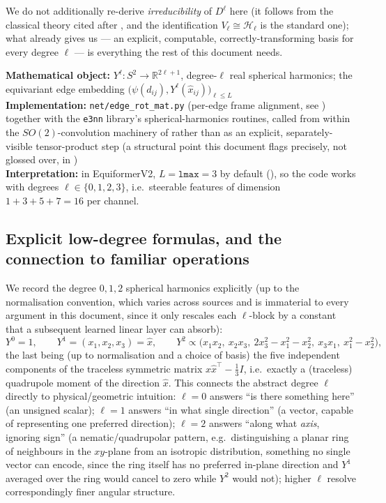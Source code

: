 \documentclass[11pt,a4paper]{report}
\theoremstyle{definition}
\theoremstyle{remark}
\newcommand{\RR}{\mathbb R}
\newcommand{\file}[1]{\texttt{#1}}
\begin{document}
We do not additionally re-derive \emph{irreducibility} of $D^\ell$ here (it
follows from the classical theory cited after
, and the identification
$V_\ell\cong\mathcal H_\ell$ is the standard one); what 
already gives us --- an explicit, computable, correctly-transforming basis
for every degree $\ell$ --- is everything the rest of this document needs.

\begin{codebox}
\textbf{Mathematical object:} $Y^\ell:S^2\to\RR^{2\ell+1}$, degree-$\ell$ real
spherical harmonics; the equivariant edge embedding
$\bigl(\psi(d_{ij}),Y^\ell(\hat x_{ij})\bigr)_{\ell\le L}$ \\
\textbf{Implementation:} \file{net/edge\_rot\_mat.py} (per-edge frame
alignment, see ) together with the \texttt{e3nn}
library's spherical-harmonics routines, called from within the
$SO(2)$-convolution machinery of  rather than
as an explicit, separately-visible tensor-product step (a structural point
this document flags precisely, not glossed over, in
) \\
\textbf{Interpretation:} in EquiformerV2, $L=\texttt{lmax}=3$ by default
(), so the code works with degrees $\ell\in\{0,1,2,3\}$,
i.e.\ steerable features of dimension $1+3+5+7=16$ per channel.
\end{codebox}

\subsection{Explicit low-degree formulas, and the connection to familiar operations}

We record the degree $0,1,2$ spherical harmonics explicitly (up to the
normalisation convention, which varies across sources and is immaterial to
every argument in this document, since it only rescales each $\ell$-block
by a constant that a subsequent learned linear layer can absorb):
\[
Y^0 = 1,
\qquad
Y^1 = (x_1,x_2,x_3)=\hat x,
\qquad
Y^2 \propto \bigl(x_1x_2,\ x_2x_3,\ 2x_3^2-x_1^2-x_2^2,\ x_3x_1,\ x_1^2-x_2^2\bigr) ,
\]
the last being (up to normalisation and a choice of basis) the five
independent components of the traceless symmetric matrix $\hat x\hat x^\top-\tfrac13I$,
i.e.\ exactly a (traceless) quadrupole moment of the direction $\hat x$.
This connects the abstract degree $\ell$ directly to physical/geometric
intuition: $\ell=0$ answers ``is there something here'' (an unsigned
scalar); $\ell=1$ answers ``in what single direction'' (a vector, capable of
representing one preferred direction); $\ell=2$ answers ``along what
\emph{axis}, ignoring sign'' (a nematic/quadrupolar pattern, e.g.\
distinguishing a planar ring of neighbours in the $xy$-plane from an
isotropic distribution, something no single vector can encode, since the
ring itself has no preferred in-plane direction and $Y^1$ averaged over the
ring would cancel to zero while $Y^2$ would not); higher $\ell$ resolve
correspondingly finer angular structure.
\end{document}
